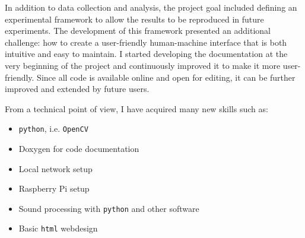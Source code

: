 In addition to data collection and analysis, the project goal included defining an experimental framework to allow the results to be reproduced in future experiments.
The development of this framework presented an additional challenge: how to create a user-friendly human-machine interface that is both intuitive and easy to maintain. 
I started developing the documentation at the very beginning of the project and continuously improved it to make it more user-friendly. 
Since all code is available online and open for editing, it can be further improved and extended by future users. 

From a technical point of view, I have acquired many new skills such as:
\vspace{-1em}
\begin{itemize}
    \item \texttt{python}, i.e. \texttt{OpenCV}
    \item Doxygen for code documentation
    \item Local network setup
    \item Raspberry Pi setup
    \item Sound processing with \texttt{python} and other software
    \item Basic \texttt{html} webdesign
\end{itemize}

\setlength{\parskip}{0em}
